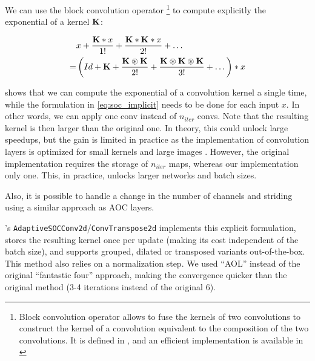         \begin{theorem}

            We can use the block convolution operator \footnote{Block convolution operator allows to fuse the kernels of two convolutions to construct the kernel of a convolution equivalent to the composition of the two convolutions. It is defined in \cite{li_preventing_2019}, and an efficient implementation is available in \cite{boissin2025adaptive}} to compute explicitly the exponential of a kernel $\mathbf{K}$:

            \begin{align}
                & x + \frac{\mathbf{K}*x}{1!} + \frac{\mathbf{K}*\mathbf{K}*x}{2!} + \dots \label{eq:soc_implicit} \\
                = & \left(Id + \mathbf{K} + \frac{\mathbf{K} \circledast \mathbf{K}}{2!} + \frac{\mathbf{K} \circledast \mathbf{K} \circledast \mathbf{K} }{3!} + \dots \right) * x \label{eq:soc_explicit}            
            \end{align}
        \end{theorem}

          shows that we can compute the exponential of a convolution kernel a single time, while the formulation in \cref{eq:soc_implicit} needs to be done for each input $x$. In other words, we can apply one conv instead of $n_{iter}$ convs. Note that the resulting kernel is then larger than the original one. In theory, this could unlock large speedups, but the gain is limited in practice as the implementation of convolution layers is optimized for small kernels and large images \cite{ding_scaling_2022}. However, the original implementation requires the storage of $n_{iter}$ maps, whereas our implementation only one. This, in practice, unlocks larger networks and batch sizes.

        Also, it is possible to handle a change in the number of channels and striding using a similar approach as AOC layers.
    
    \Orthogonium's \verb|AdaptiveSOCConv2d|/\verb|ConvTranspose2d| implements this explicit formulation, stores the resulting kernel once per update (making its cost independent of the batch size), and supports grouped, dilated or transposed variants out-of-the-box. This method also relies on a normalization step. We used ``AOL'' instead of the original ``fantastic four''\cite{singla_fantastic_2021} approach, making the convergence quicker than the original method (3-4 iterations instead of the original 6).

